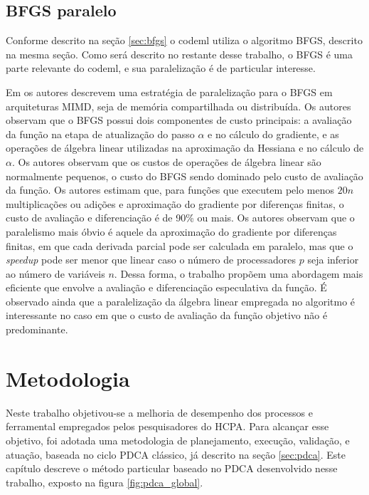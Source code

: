 \documentclass[cic,tc]{iiufrgs}
\begin{document}
\section{BFGS paralelo}
\label{sec:parbfgs}

Conforme descrito na seção \ref{sec:bfgs} o codeml utiliza o algoritmo BFGS,
descrito na mesma seção. Como será descrito no restante desse trabalho, o BFGS
é uma parte relevante do codeml, e sua paralelização é de particular interesse.

Em \cite{byrd1988parallel} os autores descrevem uma estratégia de paralelização
para o BFGS em arquiteturas MIMD, seja de memória compartilhada ou distribuída.
Os autores observam que o BFGS possui dois componentes de custo principais: a
avaliação da função na etapa de atualização do passo $\alpha$ e no cálculo do
gradiente, e as operações de álgebra linear utilizadas na aproximação da
Hessiana e no cálculo de $\alpha$. Os autores observam que os custos de
operações de álgebra linear são normalmente pequenos, o custo do BFGS sendo
dominado pelo custo de avaliação da função. Os autores estimam que, para
funções que executem pelo menos $20n$ multiplicações ou adições e aproximação
do gradiente por diferenças finitas, o custo de avaliação e diferenciação é de
90\% ou mais. Os autores observam que o paralelismo mais óbvio é aquele da
aproximação do gradiente por diferenças finitas, em que cada derivada parcial
pode ser calculada em paralelo, mas que o \textit{speedup} pode ser menor que
linear caso o número de processadores $p$ seja inferior ao número de variáveis
$n$. Dessa forma, o trabalho propõem uma abordagem mais eficiente que envolve a
avaliação e diferenciação especulativa da função. É observado ainda que a
paralelização da álgebra linear empregada no algoritmo é interessante no caso
em que o custo de avaliação da função objetivo não é predominante.

%
%
%
%

\chapter{Metodologia} 
\label{chap:mod}

Neste trabalho objetivou-se a melhoria de desempenho dos processos e
ferramental empregados pelos pesquisadores do HCPA. Para alcançar esse
objetivo, foi adotada uma metodologia de planejamento, execução, validação, e
atuação, baseada no ciclo PDCA clássico, já descrito na seção \ref{sec:pdca}.
Este capítulo descreve o método particular baseado no PDCA desenvolvido nesse
trabalho, exposto na figura \ref{fig:pdca_global}.
\end{document}

